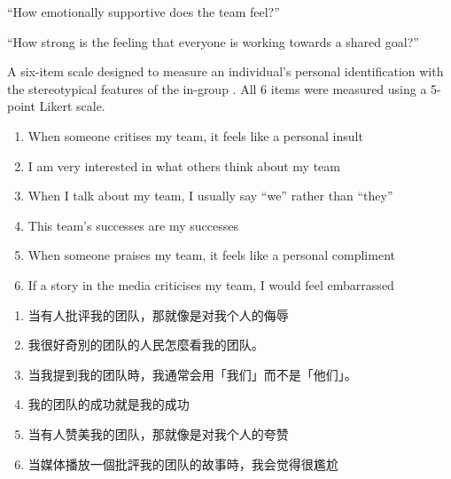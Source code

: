 \begin{CJK}{UTF8}{gbsn}



  \begin{description}[labelindent=1cm]
    \item [Emotional Support] ``How emotionally supportive does the team feel?''
    \item [Shared Goal] ``How strong is the feeling that everyone is working towards a shared goal?''
    \item [Group Identification Verbal] A six-item scale designed to measure an individual's personal identification with the stereotypical features of the in-group  \citep{Mael1992}.  All 6 items were measured using a 5-point Likert scale.
          \begin{enumerate}
            \item When someone critises my team, it feels like a personal insult
            \item I am very interested in what others think about my team
            \item When I talk about my team, I usually say ``we'' rather than ``they''
            \item This team's successes are my successes
            \item When someone praises my team, it feels like a personal compliment
            \item If a story in the media criticises my team, I would feel embarrassed
          \end{enumerate}
          \begin{enumerate}
            \item 当有人批评我的团队，那就像是对我个人的侮辱
            \item 我很好奇別的团队的人民怎麼看我的团队。
            \item 当我提到我的团队時，我通常会用「我们」而不是「他们」。
            \item 我的团队的成功就是我的成功
            \item 当有人赞美我的团队，那就像是对我个人的夸赞
            \item 当媒体播放一個批評我的团队的故事時，我会觉得很尷尬
          \end{enumerate}


\end{description}
\end{CJK}
